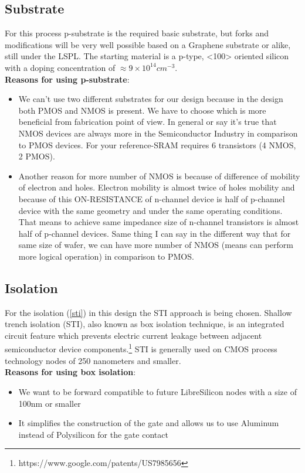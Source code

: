 
\subsection{Substrate}
For this process p-substrate is the required basic substrate, but forks and modifications will be very well possible based on a Graphene substrate or alike, still under the LSPL.
The starting material is a p-type, <100> oriented silicon with a doping concentration of $\approx 9\times10^{14}cm^{-3}$.\\

\textbf{Reasons for using p-substrate}:\begin{itemize}
\item We can't use two different substrates for our design because in the design both PMOS and NMOS is present.
We have to choose which is more beneficial from fabrication point of view.
In general or say it's true that NMOS devices are always more in the Semiconductor Industry in comparison to PMOS devices.
For your reference-SRAM requires 6 transistors (4 NMOS, 2 PMOS).
\item Another reason for more number of NMOS is because of difference of mobility of electron and holes.
Electron mobility is almost twice of holes mobility and because of this ON-RESISTANCE of n-channel device is half of p-channel device with the same geometry and under the same operating conditions.
That means to achieve same impedance size of n-channel transistors is almost half of p-channel devices.
Same thing I can say in the different way that for same size of wafer, we can have more number of NMOS (means can perform more logical operation) in comparison to PMOS.
\end{itemize}

\subsection{Isolation}
For the isolation (\autoref{sti})  in this design the STI approach is being chosen.
Shallow trench isolation (STI), also known as box isolation technique, is an integrated circuit feature which prevents electric current leakage between adjacent semiconductor device components.\footnote{https://www.google.com/patents/US7985656}
STI is generally used on CMOS process technology nodes of 250 nanometers and smaller.\\

\textbf{Reasons for using box isolation}:\begin{itemize}
\item We want to be forward compatible to future LibreSilicon nodes with a size of 100nm or smaller
\item It simplifies the construction of the gate and allows us to use Aluminum instead of Polysilicon for the gate contact
\end{itemize}


